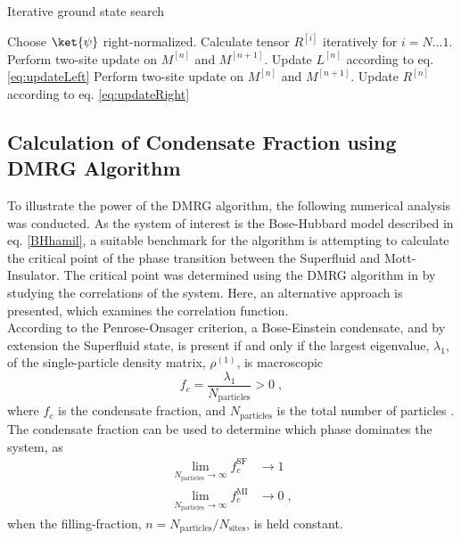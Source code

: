 \begin{algorithm}
\begin{algorithmic}
\caption{Iterative ground state search}
\State Choose $\ket{\psi}$ right-normalized.
\State Calculate tensor $R^{[i]}$ iteratively for $i = N \ldots 1$.
	 
		\State Perform two-site update on $M^{[n]}$ and $M^{[n+1]}$.
		\State Update $L^{[n]}$ according to eq. \eqref{eq:updateLeft}
	\EndFor
	 
		\State Perform two-site update on $M^{[n]}$ and $M^{[n+1]}$.
		\State Update $R^{[n]}$ according to eq. \eqref{eq:updateRight}
	\EndFor
\EndWhile
\end{algorithmic}
\end{algorithm}


\subsection{Calculation of Condensate Fraction using DMRG Algorithm}
To illustrate the power of the DMRG algorithm, the following numerical analysis was conducted. As the system of interest is the Bose-Hubbard model described in eq. \eqref{BHhamil}, a suitable benchmark for the algorithm is attempting to calculate the critical point of the phase transition between the Superfluid and Mott-Insulator. The critical point was determined using the DMRG algorithm in \cite{Kuhner2000} by studying the correlations of the system. Here, an alternative approach is presented, which examines the correlation function.\\

According to the Penrose-Onsager criterion, a Bose-Einstein condensate, and by extension the Superfluid state, is present if and only if the largest eigenvalue, $\lambda_1$, of the single-particle density matrix, $\rho^{(1)}$, is macroscopic
\begin{equation}
	f_c = \frac{\lambda_1}{N_{\mathrm{particles}}} > 0 \; ,
	\label{eq:condensateFraction}
\end{equation} 
where $f_c$ is the condensate fraction, and $N_{\mathrm{particles}}$ is the total number of particles \cite{PenroseOnsager}. The condensate fraction can be used to determine which phase dominates the system, as
\begin{align}
	\lim_{N_{\mathrm{particles}} \to \infty} f_{c}^{\mathrm{SF}} &\to 1 \label{eq:SF_lim} \\
	\lim_{N_{\mathrm{particles}} \to \infty} f_{c}^{\mathrm{MI}} &\to 0 \; , \label{eq:MI_lim}
\end{align}
when the filling-fraction, $n = N_{\mathrm{particles}}/N_{\mathrm{sites}}$, is held constant.\\

